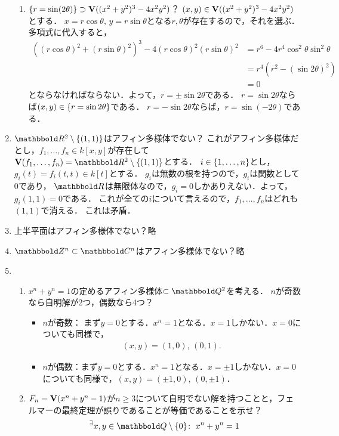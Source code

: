 \documentclass[9pt]{ltjsarticle}
\theoremstyle{break}
\theoremstyle{break}
\theoremstyle{break}
\theoremstyle{break}
\theoremstyle{break}
\theoremstyle{break}
\theoremstyle{break}
\theoremstyle{break}
\theoremstyle{break}
\theoremstyle{break}
\theoremstyle{break}
\theoremstyle{break}
\theoremstyle{break}
\theoremstyle{break}
\theoremstyle{break}
\theoremstyle{nonumberbreak}
\theoremstyle{nonumberbreak}
\begin{document}
\begin{enumerate}[label=(問題\arabic*)]
\begin{enumerate}[label=(\alph*)]
 \item $\left\{r=\sin(2\theta)\right\}\supset \textbf V((x^2+y^2)^3-4x^2y^2)$？
$(x,y)\in \textbf V((x^2+y^2)^3-4x^2y^2)$とする．
$x=r\cos \theta,\, y=r\sin\theta$となる$r,\theta$が存在するので，それを選ぶ．
多項式に代入すると，
\begin{align}
 ((r\cos\theta)^2 + (r\sin\theta)^2)^3 - 4(r\cos\theta)^2(r\sin\theta)^2
&=
r^6-4r^4\cos^2\theta \sin^2\theta\\
 & =
r^4(r^2-(\sin 2\theta)^2)\\
 & =0
\end{align}
とならなければならない．よって，$r=\pm \sin 2\theta$である．
$r=\sin2\theta$ならば$(x,y)\in \left\{r=\sin 2\theta\right\}$である．
       $r=-\sin2\theta$ならば，$r=\sin(-2\theta)$である．
\end{enumerate}

 \item $\R^2\setminus\set{(1,1)}$はアフィン多様体でない？
これがアフィン多様体だとし，$f_1,\dots,f_n \in k[x,y]$が存在して
$\var(f_1,\dots,f_n)=\R^2\setminus\set{(1,1)}$とする．
$i\in \left\{1,\dots,n\right\}$とし，$g_i(t)=f_i(t,t) \in k[t]$とする．
$g_i$は無数の根を持つので，$g_i$は関数として0であり，
$\R$は無限体なので，$g_i =0$しかありえない．よって，$g_i(1,1)=0$である．
これが全ての$i$について言えるので，$f_1,\dots,f_n$はどれも$(1,1)$で消える．
これは矛盾．
 \item 上半平面はアフィン多様体でない？略
 \item $\Z^n \subset \C^n$はアフィン多様体でない？略
 \item
\begin{enumerate}[label=(\alph*)]
 \item $x^n+y^n=1$の定めるアフィン多様体$\subset \Q^2$を考える．
$n$が奇数なら自明解が2つ，偶数なら4つ？
\begin{itemize}
 \item $n$が奇数：
まず$y=0$とする．$x^n=1$となる．$x=1$しかない．$x=0$についても同様で，
\begin{align}
 (x,y) = (1,0),\,(0,1).
\end{align}
 \item $n$が偶数：まず$y=0$とする．$x^n=1$となる．$x=\pm 1$しかない．$x=0$についても同様で，$(x,y)=(\pm 1,0),\, (0,\pm 1)$．
\end{itemize}
 \item $F_n=\textbf V(x^n+y^n-1)$が$n\ge 3$について自明でない解を持つことと，フェルマーの最終定理が誤りであることが等価であることを示せ？
\begin{align}
& \Exists{x,y \in \Q\setminus\zeroset} x^n+y^n = 1\\

\end{align}
\end{enumerate}
\end{enumerate}
\end{document}
